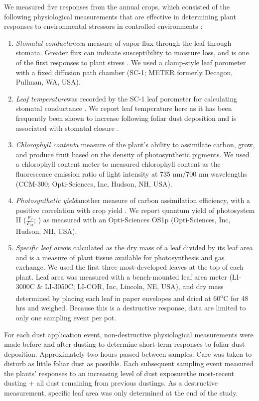 \documentclass{svjour3}
\begin{document}
We measured five responses from the annual crops, which consisted of the following physiological measurements that are effective in determining plant responses to environmental stressors in controlled environments \citep{mcgranahan2018b}: 
\begin{enumerate}
	\item \emph{Stomatal conductance}\textemdash a measure of vapor flux through the leaf through stomata. 
	Greater flux can indicate susceptibility to moisture loss, and is one of the first responses to plant stress \citep{flexas2002}. 
	We used a clamp-style leaf porometer with a fixed diffusion path chamber (SC-1; METER formerly Decagon, Pullman, WA, USA). 
	\item \emph{Leaf temperature}\textemdash was recorded by the SC-1 leaf porometer for calculating stomatal conductance \citep{metergroup2020}. 
	We report leaf temperature here as it has been frequently been shown to increase following foliar dust deposition and is associated with stomatal closure \citep{eller1977, zia-khan2014}. 
	\item \emph{Chlorophyll content}\textemdash a measure of the plant's ability to assimilate carbon, grow, and produce fruit based on the density of photosynthetic pigments. 
	We used a chlorophyll content meter to measured chlorophyll content as the fluorescence emission ratio of light intensity at 735 nm/700 nm wavelengths
	 (CCM-300; Opti-Sciences, Inc, Hudson, NH, USA).
	\item \emph{Photosynthetic yield}\textemdash another measure of carbon assimilation efficiency, with a positive correlation with crop yield \citep{fischer1998}. 
	We report quantum yield of photosystem II ($\frac{F_{V}}{F_{M}}$;  \citet{kalaji2017}) as measured with an Opti-Sciences OS1p (Opti-Sciences, Inc, Hudson, NH, USA). 
	\item \emph{Specific leaf area}\textemdash is calculated as the dry mass of a leaf divided by its leaf area and is a measure of plant tissue available for photosynthesis and gas exchange. 
	We used the first three most-developed leaves at the top of each plant. 
	Leaf area was measured with a bench-mounted leaf area meter (LI-3000C \& LI-3050C; LI-COR, Inc, Lincoln, NE, USA), and dry mass determined by placing each leaf in paper envelopes and dried at 60\textsuperscript{o}C for 48 hrs and weighed.
	Because this is a destructive response, data are limited to only one sampling event per pot.
\end{enumerate} 

For each dust application event, non-destructive physiological measurements were made before and after dusting to determine short-term responses to foliar dust deposition. 
Approximately two hours passed between samples.
Care was taken to disturb as little foliar dust as possible.
Each subsequent sampling event measured the plants' responses to an increasing level of dust exposure\textemdash the most-recent dusting + all dust remaining from previous dustings. 
As a destructive measurement, specific leaf area was only determined at the end of the study. 
\end{document}
